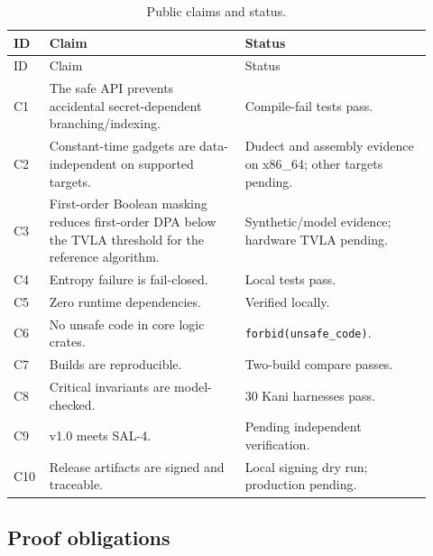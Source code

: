 \documentclass[11pt,a4paper]{article}
\newcommand{\code}[1]{\texttt{#1}}
\theoremstyle{plain}
\theoremstyle{definition}
\theoremstyle{remark}
\begin{document}
\begin{longtable}{@{}p{0.06\linewidth}p{0.44\linewidth}p{0.42\linewidth}@{}}
\caption{Public claims and status.}\label{tab:claims}\\
\toprule
ID & Claim & Status \\
\midrule
\endfirsthead
\toprule
ID & Claim & Status \\
\midrule
\endhead
C1 & The safe API prevents accidental secret-dependent branching/indexing. &
Compile-fail tests pass. \\
C2 & Constant-time gadgets are data-independent on supported targets. &
Dudect and assembly evidence on x86\_64; other targets pending. \\
C3 & First-order Boolean masking reduces first-order DPA below the TVLA threshold for
the reference algorithm. &
Synthetic/model evidence; hardware TVLA pending. \\
C4 & Entropy failure is fail-closed. &
Local tests pass. \\
C5 & Zero runtime dependencies. &
Verified locally. \\
C6 & No unsafe code in core logic crates. &
\code{forbid(unsafe\_code)}. \\
C7 & Builds are reproducible. &
Two-build compare passes. \\
C8 & Critical invariants are model-checked. &
30 Kani harnesses pass. \\
C9 & v1.0 meets SAL-4. &
Pending independent verification. \\
C10 & Release artifacts are signed and traceable. &
Local signing dry run; production pending. \\
\bottomrule
\end{longtable}

\subsection{Proof obligations}
\end{document}
